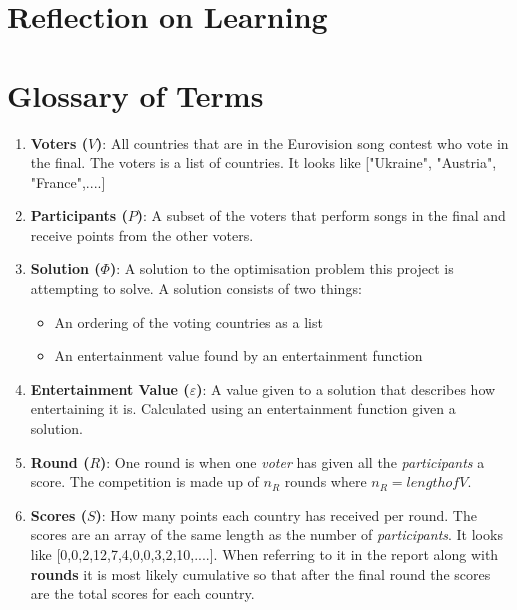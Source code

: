 \documentclass[12pt]{report}
\begin{document}
\section{Reflection on Learning}\label{Reflection}

\section*{Glossary of Terms}
\begin{enumerate}
\item \textbf{Voters ($V$)}: All countries that are in the Eurovision song contest who vote in the final. The voters is a list of countries. It looks like ["Ukraine", "Austria", "France",....]
\item \textbf{Participants ($P$)}: A subset of the voters that perform songs in the final and receive points from the other voters.
\item \textbf{Solution ($\Phi$)}: A solution to the optimisation problem this project is attempting to solve. A solution consists of two things:
	\begin{itemize}
		\item An ordering of the voting countries as a list
		\item An entertainment value found by an entertainment function
	\end{itemize}
\item \textbf{Entertainment Value ($\varepsilon$)}: A value given to a solution that describes how entertaining it is. Calculated using an entertainment function given a solution.
\item \textbf{Round ($R$)}: One round is when one \textit{voter} has given all the \textit{participants} a score. The competition is made up of $n_R$ rounds where $n_R = length of V$.
\item \textbf{Scores ($S$)}: How many points each country has received per round. The scores are an array of the same length as the number of \textit{participants}. It looks like [0,0,2,12,7,4,0,0,3,2,10,....]. When referring to it in the report along with \textbf{rounds} it is most likely cumulative so that after the final round the scores are the total scores for each country.
\end{enumerate}
\end{document}

